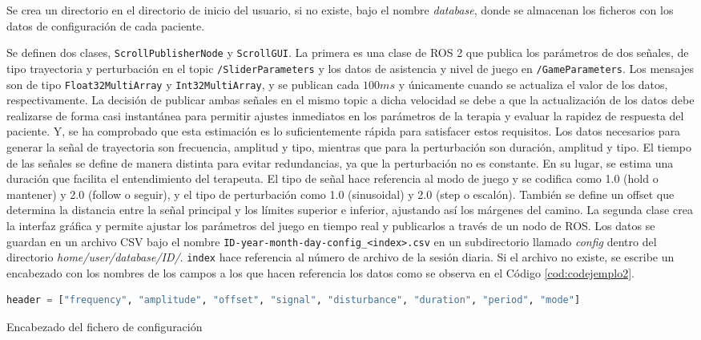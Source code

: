 Se crea un directorio en el directorio de inicio del usuario, si no existe, bajo el nombre \textit{database}, donde se almacenan los ficheros con los datos de configuración de cada paciente.

Se definen dos clases, \verb|ScrollPublisherNode| y \verb|ScrollGUI|.
La primera es una clase de ROS 2 que publica los parámetros de dos señales, de tipo trayectoria y perturbación en el topic \verb|/SliderParameters| y los datos de asistencia y nivel de juego en \verb|/GameParameters|.
Los mensajes son de tipo \verb|Float32MultiArray| y \verb|Int32MultiArray|, y se publican cada $100 ms$ y únicamente cuando se actualiza el valor de los datos, respectivamente.
La decisión de publicar ambas señales en el mismo topic a dicha velocidad se debe a que la actualización de los datos debe realizarse de forma casi instantánea para permitir ajustes inmediatos en los parámetros de la terapia y evaluar la rapidez de respuesta del paciente.
Y, se ha comprobado que esta estimación es lo suficientemente rápida para satisfacer estos requisitos.
Los datos necesarios para generar la señal de trayectoria son frecuencia, amplitud y tipo, mientras que para la perturbación son duración, amplitud y tipo.
El tiempo de las señales se define de manera distinta para evitar redundancias, ya que la perturbación no es constante.
En su lugar, se estima una duración que facilita el entendimiento del terapeuta.
El tipo de señal hace referencia al modo de juego y se codifica como 1.0 (hold o mantener) y 2.0 (follow o seguir), y el tipo de perturbación como 1.0 (sinusoidal) y 2.0 (step o escalón).
También se define un offset que determina la distancia entre la señal principal y los límites superior e inferior, ajustando así los márgenes del camino.
La segunda clase crea la interfaz gráfica y permite ajustar los parámetros del juego en tiempo real y publicarlos a través de un nodo de ROS.
Los datos se guardan en un archivo CSV bajo el nombre \verb|ID-year-month-day-config_<index>.csv| en un subdirectorio llamado \textit{config} dentro del directorio \textit{home/user/database/ID/}.
\verb|index| hace referencia al número de archivo de la sesión diaria.
Si el archivo no existe, se escribe un encabezado con los nombres de los campos a los que hacen referencia los datos como se observa en el Código \ref{cod:codejemplo2}.

\begin{code}[h]
\begin{lstlisting}[language=Python]
header = ["frequency", "amplitude", "offset", "signal", "disturbance", "duration", "period", "mode"]
\end{lstlisting}
\caption[Encabezado del fichero de configuración]{Encabezado del fichero de configuración}
\label{cod:codejemplo2}
\end{code}

